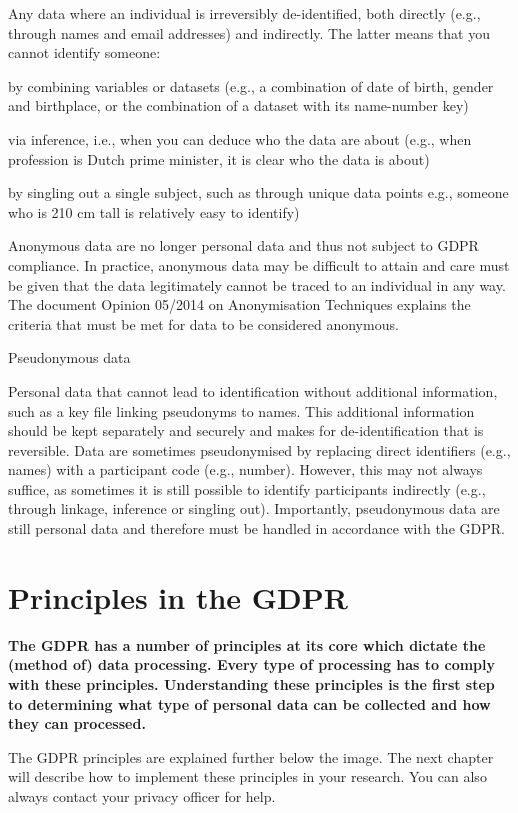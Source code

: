 \documentclass[
]{book}
\begin{document}
Any data where an individual is irreversibly de-identified, both directly
(e.g., through names and email addresses) and indirectly. The latter means
that you cannot identify someone:

by combining variables or datasets (e.g., a combination of date of birth,
gender and birthplace, or the combination of a dataset with its name-number key)

via inference, i.e., when you can deduce who the data are about (e.g.,
when profession is Dutch prime minister, it is clear who the data is about)

by singling out a single subject, such as through unique data points
e.g., someone who is 210 cm tall is relatively easy to identify)

Anonymous data are no longer personal data and thus not subject to GDPR
compliance. In practice, anonymous data may be difficult to attain and care
must be given that the data legitimately cannot be traced to an individual in
any way. The document
Opinion 05/2014 on Anonymisation Techniques
explains the criteria that must be met for data to be considered anonymous.

Pseudonymous data

Personal data that cannot lead to identification without additional
information, such as a key file linking pseudonyms to names. This additional
information should be kept separately and securely and makes for
de-identification that is reversible. Data are sometimes pseudonymised by
replacing direct identifiers (e.g., names) with a participant code (e.g.,
number). However, this may not always suffice, as sometimes it is still
possible to identify participants indirectly (e.g., through linkage, inference
or singling out). Importantly, pseudonymous data are still personal data and
therefore must be handled in accordance with the GDPR.

\hypertarget{gdpr-principles}{%
\section{Principles in the GDPR}\label{gdpr-principles}}

\textbf{The GDPR has a number of principles at its core which dictate the (method of)
data processing. Every type of processing has to comply with these principles.
Understanding these principles is the first step to determining what type of
personal data can be collected and how they can processed.}

The GDPR principles are explained further below the image. The
next chapter will describe how to implement these
principles in your research. You can also always contact your
privacy officer for help.
\end{document}
